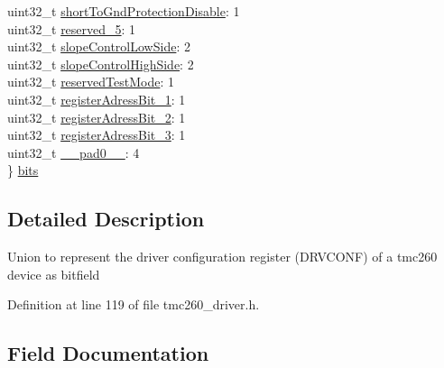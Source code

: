 \begin{DoxyCompactItemize}
\begin{tabbing}
\>uint32\_t \mbox{\hyperlink{uniontmc260___driver_configuration_register___a0196824d810906d80a1ee06cc4e7db69}{shortToGndProtectionDisable}}: 1\\
\>uint32\_t \mbox{\hyperlink{uniontmc260___driver_configuration_register___a152f0f8f3170035b68daa18ed2310af5}{reserved\_5}}: 1\\
\>uint32\_t \mbox{\hyperlink{uniontmc260___driver_configuration_register___a187198a5ff773b84645d1d5d6ce076e8}{slopeControlLowSide}}: 2\\
\>uint32\_t \mbox{\hyperlink{uniontmc260___driver_configuration_register___a1805068ae9f8a63293faf7455d59fe15}{slopeControlHighSide}}: 2\\
\>uint32\_t \mbox{\hyperlink{uniontmc260___driver_configuration_register___aa0f988d1c74f579b275ffffe77c334df}{reservedTestMode}}: 1\\
\>uint32\_t \mbox{\hyperlink{uniontmc260___driver_configuration_register___a8e58d0701295971bc3d890f5107f8aa5}{registerAdressBit\_1}}: 1\\
\>uint32\_t \mbox{\hyperlink{uniontmc260___driver_configuration_register___abd6d1c957737511340b85f5c2d61f9ab}{registerAdressBit\_2}}: 1\\
\>uint32\_t \mbox{\hyperlink{uniontmc260___driver_configuration_register___a3da0387ab629039b91d051ab328910f0}{registerAdressBit\_3}}: 1\\
\>uint32\_t \mbox{\hyperlink{uniontmc260___driver_configuration_register___a3e57c2ef1c3ffb36722f000cc1156824}{\_\_pad0\_\_}}: 4\\
\} \mbox{\hyperlink{uniontmc260___driver_configuration_register___a949ee4f57df8b1c70d9f774f00276c49}{bits}}\\

\end{tabbing}\end{DoxyCompactItemize}


\subsection{Detailed Description}
Union to represent the driver configuration register (D\+R\+V\+C\+O\+NF) of a tmc260 device as bitfield 

Definition at line 119 of file tmc260\+\_\+driver.\+h.



\subsection{Field Documentation}
\mbox{\label{uniontmc260___driver_configuration_register___a3e57c2ef1c3ffb36722f000cc1156824}} 
